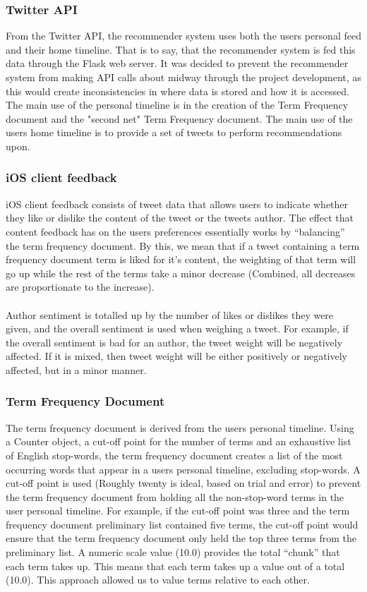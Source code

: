 \documentclass{article}
\begin{document}
\subsubsection*{Twitter API} 
From the Twitter API, the recommender system uses both the users personal feed and their home timeline. That is to say, that the recommender system is fed this data through the Flask web server. It was decided to prevent the recommender system from making API calls about midway through the project development, as this would create inconsistencies in where data is stored and how it is accessed. The main use of the personal timeline is in the creation of the Term Frequency document and the "second net" Term Frequency document. The main use of the users home timeline is to provide a set of tweets to perform recommendations upon.

\subsubsection*{iOS client feedback} 
iOS client feedback consists of tweet data that allows users to indicate whether they like or dislike the content of the tweet or the tweets author. The effect that content feedback has on the users preferences essentially works by “balancing” the term frequency document. By this, we mean that if a tweet containing a term frequency document term is liked for it’s content, the weighting of that term will go up while the rest of the terms take a minor decrease (Combined, all decreases are proportionate to the increase). 
\\\\
Author sentiment is totalled up by the number of likes or dislikes they were given, and the overall sentiment is used when weighing a tweet. For example, if the overall sentiment is bad for an author, the tweet weight will be negatively affected. If it is mixed, then tweet weight will be either positively or negatively affected, but in a minor manner.

\subsubsection*{Term Frequency Document} 
The term frequency document is derived from the users personal timeline. Using a Counter object, a cut-off point for the number of terms and an exhaustive list of English stop-words, the term frequency document creates a list of the most occurring words that appear in a users personal timeline, excluding stop-words. A cut-off point is used (Roughly twenty is ideal, based on trial and error) to prevent the term frequency document from holding all the non-stop-word terms in the user personal timeline. For example, if the cut-off point was three and the term frequency document preliminary list contained five terms, the cut-off point would ensure that the term frequency document only held the top three terms from the preliminary list. A numeric scale value (10.0) provides the total “chunk” that each term takes up. This means that each term takes up a value out of a total (10.0). This approach allowed us to value terms relative to each other.
\end{document}

